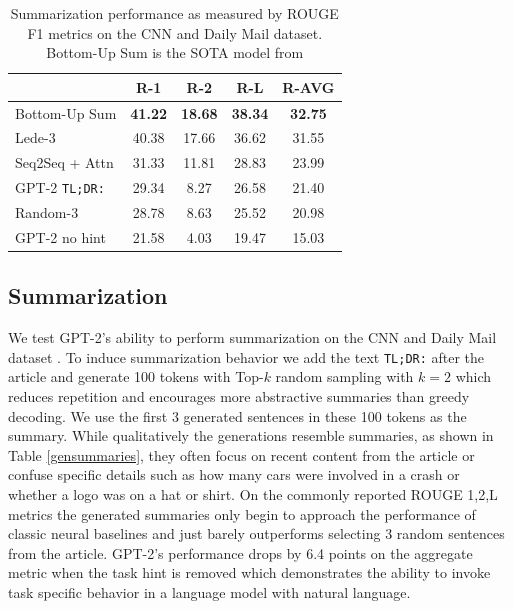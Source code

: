 \documentclass{article}
\begin{document}
\begin{table}[t]
\vskip 0.15in
\begin{center}
\begin{small}
\begin{tabular}{l|ccc|c}
\toprule
 & R-1 & R-2 & R-L & R-AVG \\
\midrule
Bottom-Up Sum & \textbf{41.22} & \textbf{18.68} & \textbf{38.34} & \textbf{32.75}\\
Lede-3 & 40.38 & 17.66 & 36.62 & 31.55 \\
Seq2Seq + Attn & 31.33 & 11.81 & 28.83 & 23.99 \\
GPT-2 \texttt{TL;DR:} & 29.34 & 8.27 & 26.58 & 21.40 \\
Random-3 & 28.78 & 8.63 & 25.52 & 20.98 \\
GPT-2 no hint & 21.58 & 4.03 & 19.47 & 15.03 \\
\bottomrule
\end{tabular}
\end{small}
\caption{Summarization performance as measured by ROUGE F1 metrics on the CNN and Daily Mail dataset. Bottom-Up Sum is the SOTA model from \cite{gehrmann2018bottom}}
\label{summarization}
\end{center}
\vskip -0.1in
\end{table}

\subsection{Summarization}

We test GPT-2's ability to perform summarization on the CNN and Daily Mail dataset \cite{nallapati2016abstractive}. To induce summarization behavior we add the text \texttt{TL;DR:} after the article and generate 100 tokens with Top-$k$ random sampling \cite{fan2018hierarchical} with $k=2$ which reduces repetition and encourages more abstractive summaries than greedy decoding. We use the first 3 generated sentences in these 100 tokens as the summary. While qualitatively the generations resemble summaries, as shown in Table \ref{gensummaries}, they often focus on recent content from the article or confuse specific details such as how many cars were involved in a crash or whether a logo was on a hat or shirt. On the commonly reported ROUGE 1,2,L metrics the generated summaries only begin to approach the performance of classic neural baselines and just barely outperforms selecting 3 random sentences from the article. GPT-2's performance drops by 6.4 points on the aggregate metric when the task hint is removed which demonstrates the ability to invoke task specific behavior in a language model with natural language.
\end{document}
